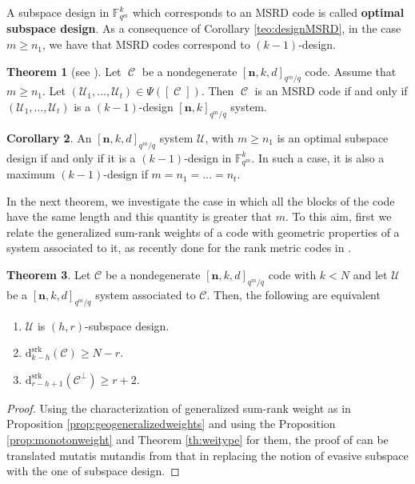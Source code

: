 \documentclass[11pt]{amsart}
\DeclareMathOperator{\C}{\mathcal{C}}
\theoremstyle{definition}
\newtheorem{theorem}{Theorem}[section]
\newtheorem{corollary}[theorem]{Corollary}
\newcommand{\cC}{{\mathcal C}}
\newcommand{\F}{{\mathbb F}}
\newcommand{\ds}{\mathrm{d}^{\mathrm{srk}}}
\newcommand{\bfn}{\mathbf {n}}
\newcommand{\Fmnkd}{[\bfn,k,d]_{q^m/q}}
\begin{document}
A subspace design in $\F_{q^m}^k$ which corresponds to an MSRD code is called \textbf{optimal subspace design}.
 As a consequence of Corollary \ref{teo:designMSRD}, in the case $m\geq n_1$, we have that MSRD codes correspond to $(k-1)$-design.
\begin{theorem} [see \textnormal{\cite[Corollary 3.10]{neri2023geometry}}]
    Let $\C$ be a nondegenerate $\Fmnkd$ code. Assume that $m \geq n_1$. Let $(\mathcal{U}_1,\ldots,\mathcal{U}_t) \in \Psi([\C])$. Then $\C$ is an MSRD code if and only if $(\mathcal{U}_1,\ldots,\mathcal{U}_t)$ is a $(k-1)$-design $[\bfn,k]_{q^m/q}$ system.
\end{theorem}

\begin{corollary}
    An $\Fmnkd$ system $\mathcal{U}$, with $m \geq n_1$ is an optimal subspace design if and only if it is a $(k-1)$-design in $\F_{q^m}^k$. In such a case, it is also a maximum $(k-1)$-design if $m=n_1=\ldots=n_t$.
\end{corollary}

In the next theorem, we investigate the case in which all the blocks of the code have the same length and this quantity is greater that $m$. To this aim, first we relate the generalized sum-rank weights of a code with geometric properties of a system associated to it, as recently done for the rank metric codes in \cite[Theorem 3.3]{marino2022evasive}.

\begin{theorem} \label{th:connectiondesignweight}
    Let $\mathcal{C}$ be a nondegenerate $\Fmnkd$ code with $k<N$ and let $\mathcal{U}$ be a $\Fmnkd$ system associated to $\cC$. Then, the following are equivalent
    \begin{enumerate}
        \item $\mathcal{U}$ is $(h,r)$-subspace design.
        \item $\ds_{k-h}(\mathcal{C}) \geq N-r$.
        \item $\ds_{r-h+1}(\mathcal{C}^{\perp}) \geq r+2$.
    \end{enumerate}
   
\end{theorem}
\begin{proof}
Using the characterization of generalized sum-rank weight as in Proposition \ref{prop:geogeneralizedweights} and using the Proposition \ref{prop:monotonweight} and Theorem \ref{th:weitype} for them, the
proof of can be translated mutatis mutandis from that in \cite[Theorem 3.3]{marino2022evasive} replacing the notion of evasive subspace with the one of subspace design.
\end{proof}
\end{document}
